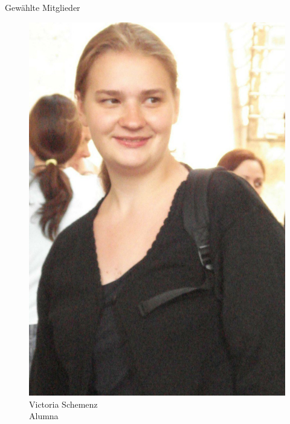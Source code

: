 \documentclass[compress, aspectratio=169]{beamer}
\begin{document}
\begin{frame}{Gewählte Mitglieder}
\begin{minipage}{.28\textwidth}
  \end{minipage}
  \hspace{0.1\textwidth}
  \begin{minipage}{.28\textwidth}
    \begin{figure}
      \begin{minipage}[c]{.57\textwidth}
        \includegraphics[height=0.35\textheight]{vicky.jpg}
      \end{minipage} \hfill
      \begin{minipage}[c]{.4\textwidth}
        \caption*{Victoria Schemenz \\Alumna}
      \end{minipage}
    \end{figure}
  \end{minipage}
  \hspace{0.1\textwidth}

\end{frame}
\end{document}
